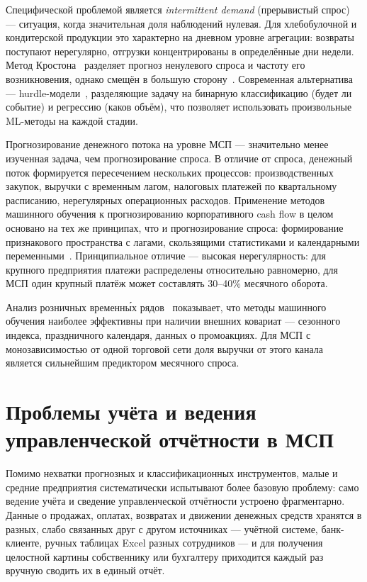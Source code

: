 Специфической проблемой является \textit{intermittent demand} (прерывистый спрос)~\cite{croston1972forecasting} --- ситуация, когда значительная доля наблюдений нулевая. Для хлебобулочной и кондитерской продукции это характерно на дневном уровне агрегации: возвраты поступают нерегулярно, отгрузки концентрированы в определённые дни недели. Метод Кростона~\cite{croston1972forecasting} разделяет прогноз ненулевого спроса и частоту его возникновения, однако смещён в большую сторону~\cite{syntetos2001bias}. Современная альтернатива --- hurdle-модели~\cite{lambert1992zero}, разделяющие задачу на бинарную классификацию (будет ли событие) и регрессию (каков объём), что позволяет использовать произвольные ML-методы на каждой стадии.

Прогнозирование денежного потока на уровне МСП --- значительно менее изученная задача, чем прогнозирование спроса. В отличие от спроса, денежный поток формируется пересечением нескольких процессов: производственных закупок, выручки с временным лагом, налоговых платежей по квартальному расписанию, нерегулярных операционных расходов. Применение методов машинного обучения к прогнозированию корпоративного cash flow в целом~\cite{lopezdeprado2018advances} основано на тех же принципах, что и прогнозирование спроса: формирование признакового пространства с лагами, скользящими статистиками и календарными переменными~\cite{ke2017lightgbm}. Принципиальное отличие --- высокая нерегулярность: для крупного предприятия платежи распределены относительно равномерно, для МСП один крупный платёж может составлять 30--40\% месячного оборота.

Анализ розничных временны́х рядов~\cite{fildes2019retail} показывает, что методы машинного обучения наиболее эффективны при наличии внешних ковариат --- сезонного индекса, праздничного календаря, данных о промоакциях. Для МСП с монозависимостью от одной торговой сети доля выручки от этого канала является сильнейшим предиктором месячного спроса.


\section{Проблемы учёта и ведения управленческой отчётности в МСП}

Помимо нехватки прогнозных и классификационных инструментов, малые и средние предприятия систематически испытывают более базовую проблему: само ведение учёта и сведение управленческой отчётности устроено фрагментарно. Данные о продажах, оплатах, возвратах и движении денежных средств хранятся в разных, слабо связанных друг с другом источниках --- учётной системе, банк-клиенте, ручных таблицах Excel разных сотрудников --- и для получения целостной картины собственнику или бухгалтеру приходится каждый раз вручную сводить их в единый отчёт.

